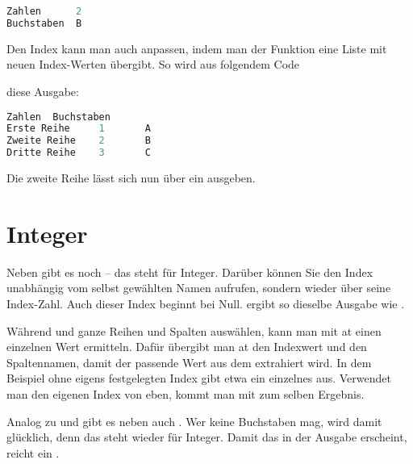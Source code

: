 \begin{lstlisting}[language=Python]
Zahlen	    2
Buchstaben	B
\end{lstlisting}

\medskip

Den Index kann man auch anpassen, indem man der Funktion  eine Liste mit neuen Index-Werten übergibt. So wird aus folgendem Code

\medskip


\medskip

diese Ausgabe:

\medskip

\begin{lstlisting}[language=Python]
                Zahlen  Buchstaben
Erste Reihe	    1       A
Zweite Reihe    2       B
Dritte Reihe    3       C
\end{lstlisting}

\medskip


Die zweite Reihe lässt sich nun über ein  ausgeben.

\section{Integer}

Neben  gibt es noch  -- das  steht für Integer. Darüber können Sie den Index unabhängig vom selbst gewählten Namen aufrufen, sondern wieder über seine Index-Zahl. Auch dieser Index beginnt bei Null.  ergibt so dieselbe Ausgabe wie .

Während  und  ganze Reihen und Spalten auswählen, kann man mit at einen einzelnen Wert ermitteln. Dafür übergibt man at den Indexwert und den Spaltennamen, damit der passende Wert aus dem  extrahiert wird. In dem Beispiel ohne eigens festgelegten Index gibt etwa  ein einzelnes  aus. Verwendet man den eigenen Index von eben, kommt man mit  zum selben Ergebnis.

Analog zu  und  gibt es neben  auch . Wer keine Buchstaben mag, wird damit glücklich, denn das  steht wieder für Integer. Damit das  in der Ausgabe erscheint, reicht ein .


